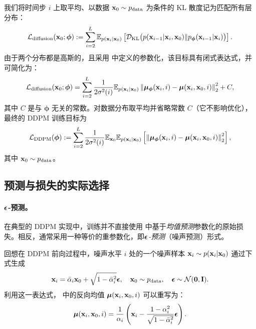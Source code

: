 我们将时间步 $i$ 上取平均、以数据 ${\mathbf{x}}_0 \sim p_{\text{data}}$ 为条件的 KL 散度记为匹配所有层分布：
\begin{align}\label{eq:ddpm-diffusion}
    \mathcal{L}_{\text{diffusion}}({\mathbf{x}}_0;\bm{\phi}) := \sum_{i=2}^L \mathbb{E}_{p({\mathbf{x}}_i|{\mathbf{x}}_0)}\left[\mathcal{D}_{\text{KL}}\big(p({\mathbf{x}}_{i-1}|{\mathbf{x}}_i, {\mathbf{x}}_0)  \Vert  p_{\bm{\phi}}({\mathbf{x}}_{i-1}|{\mathbf{x}}_i)\big)\right].
\end{align}
由于两个分布都是高斯的，且采用  中定义的参数化，该目标具有闭式表达式，并可简化为：
\begin{align}\label{eq:ddpm-diffusion-simp}
    \mathcal{L}_{\text{diffusion}}({\mathbf{x}}_0;\bm{\phi}) = \sum_{i=2}^L \frac{1}{2\sigma^2(i)}  \mathbb{E}_{p({\mathbf{x}}_i|{\mathbf{x}}_0)}\left\| \bm{\mu}_{\bm{\phi}}({\mathbf{x}}_i, i) - \bm{\mu}({\mathbf{x}}_i, {\mathbf{x}}_0, i) \right\|_2^2 + C,
\end{align}
其中 $C$ 是与 $\bm{\phi}$ 无关的常数。对数据分布取平均并省略常数 $C$（它不影响优化），最终的 DDPM 训练目标为
\begin{align}
\begin{aligned}
    \label{eq:ddpm-mean-loss}
    \mathcal{L}_{\text{DDPM}}(\bm{\phi}) := \sum_{i=2}^L \frac{1}{2\sigma^2(i)}  \mathbb{E}_{{\mathbf{x}}_0} \mathbb{E}_{p(\mathbf{x}_i|{\mathbf{x}}_0)} \left[ \left\| \bm{\mu}_{\bm{\phi}}(\mathbf{x}_i, i) - \bm{\mu}(\mathbf{x}_i, {\mathbf{x}}_0, i) \right\|_2^2 \right],
\end{aligned}
\end{align}
其中 ${\mathbf{x}}_0\sim p_{\mathrm{data}}$。

\subsection{预测与损失的实际选择}\label{subsec:ddpm-prediction}

\paragraph{${\bm{\epsilon}}$-预测。}
在典型的 DDPM 实现中，训练并不直接使用  中基于\emph{均值预测}参数化的原始损失。相反，通常采用一种等价的重参数化，即\emph{${\bm{\epsilon}}$-预测}（噪声预测）形式。

回想在 DDPM 前向过程中，噪声水平 $i$ 处的一个噪声样本 ${\mathbf{x}}_i \sim p({\mathbf{x}}_i |{\mathbf{x}}_0)$ 通过下式生成
\begin{equation}\label{eq:ddpm-perturbation}
    {\mathbf{x}}_i = \bar{\alpha}_i {\mathbf{x}}_0 + \sqrt{1 - \bar{\alpha}_i^2}   \boldsymbol{\epsilon}, \quad {\mathbf{x}}_0 \sim p_{\text{data}}, \quad \boldsymbol{\epsilon} \sim \mathcal{N}(\mathbf{0}, \mathbf{I}).
\end{equation}
利用这一表达式， 中的反向均值 $\bm{\mu}({\mathbf{x}}_i, {\mathbf{x}}_0, i)$ 可以重写为：
\[
\bm{\mu}({\mathbf{x}}_i, {\mathbf{x}}_0, i) = \frac{1}{\alpha_i} \left( {\mathbf{x}}_i - \frac{1 - \alpha_i^2}{\sqrt{1 - \bar{\alpha}_i^2}} \boldsymbol{\epsilon} \right).
\]

